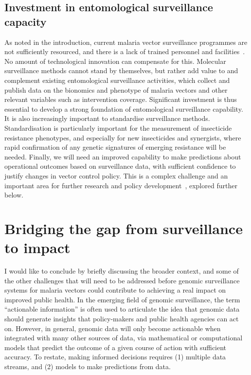 \begin{refsection}
\subsection{Investment in entomological surveillance capacity}

As noted in the introduction, current malaria vector surveillance programmes are not sufficiently resourced, and there is a lack of trained personnel and facilities~\parencite{Russell2020}.
%
No amount of technological innovation can compensate for this.
%
Molecular surveillance methods cannot stand by themselves, but rather add value to and complement existing entomological surveillance activities, which collect and publish data on the bionomics and phenotype of malaria vectors and other relevant variables such as intervention coverage.
%
Significant investment is thus essential to develop a strong foundation of entomological surveillance capability.
%
It is also increasingly important to standardise surveillance methods.
%
Standardisation is particularly important for the measurement of insecticide resistance phenotypes, and especially for new insecticides and synergists, where rapid confirmation of any genetic signatures of emerging resistance will be needed.
%
Finally, we will need an improved capability to make predictions about operational outcomes based on surveillance data, with sufficient confidence to justify changes in vector control policy.
%
This is a complex challenge and an important area for further research and policy development~\parencite{Churcher2016,SherrardSmith2018,South2018,Lines2019}, explored further below.


\section{Bridging the gap from surveillance to impact}\label{sec:discuss-external}


I would like to conclude by briefly discussing the broader context, and some of the other challenges that will need to be addressed before genomic surveillance systems for malaria vectors could contribute to achieving a real impact on improved public health.
%
In the emerging field of genomic surveillance, the term ``actionable information'' is often used to articulate the idea that genomic data should generate insights that policy-makers and public health agencies can act on.
%
However, in general, genomic data will only become actionable when integrated with many other sources of data, via mathematical or computational models that predict the outcome of a given course of action with sufficient accuracy.
%
To restate, making informed decisions requires (1) multiple data streams, and (2) models to make predictions from data.
%



\end{refsection}
